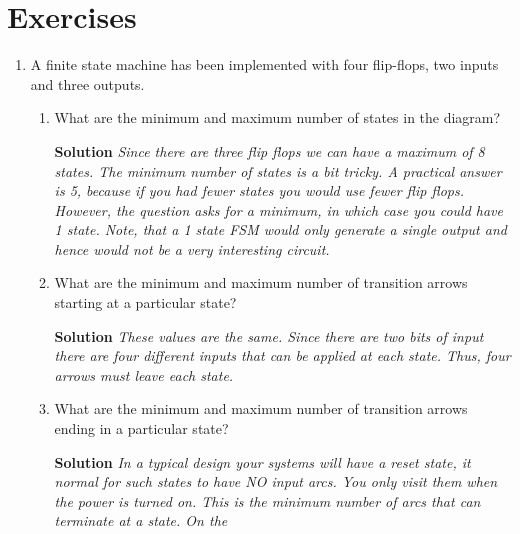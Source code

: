 \section{Exercises}
\label{section:finiteStateMachines}
\graphicspath{ {./chapter07/FigHw} }

\begin{enumerate}
    \item A finite state machine has been implemented with four
        flip-flops, two inputs and three outputs.
        \begin{enumerate}
            \item What are the minimum and maximum number of states in the diagram?
                \begin{onlysolution}  \textbf{Solution} \itshape{
                        Since there are three flip flops we can have a maximum of 8 states.  The minimum
                        number of states is a bit tricky.  A practical answer is 5, because if you
                        had fewer states you would use fewer flip flops.  However, the question
                        asks for a minimum, in which case you could have 1 state.  Note, that a
                        1 state FSM would only generate a single output and hence would not be a
                        very interesting circuit.
                    }
                \end{onlysolution}
            \item What are the minimum and maximum number of transition arrows
                starting at a particular state?
                \begin{onlysolution}  \textbf{Solution} \itshape{
                        These values are the same.  Since there are two bits of input there are four
                        different inputs that can be applied at each state.  Thus, four arrows must
                        leave each state.
                    }
                \end{onlysolution}
            \item What are the minimum and maximum number of transition arrows
                ending in a particular state?
                \begin{onlysolution}  \textbf{Solution} \itshape{
                        In a typical design your systems will have a reset state, it normal for such
                        states to have NO input arcs.  You only visit them when the power is turned on.
                        This is the minimum number of arcs that can terminate at a state.  On the
}
\end{onlysolution}
\end{enumerate}
\end{enumerate}
